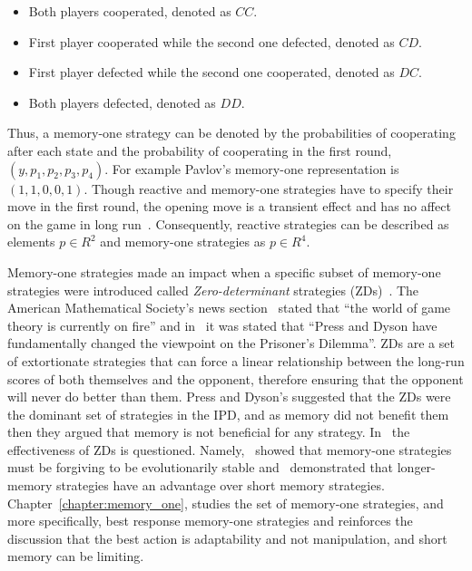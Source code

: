 \begin{itemize}
    \item Both players cooperated, denoted as \(CC\).
    \item First player cooperated while the second one defected, denoted as \(CD\).
    \item First player defected while the second one cooperated, denoted as \(DC\).
    \item Both players defected, denoted as \(DD\).
\end{itemize}

Thus, a memory-one strategy can be denoted by the probabilities of cooperating
after each state and the probability of cooperating in the first round, \((y,
p_1, p_2, p_3, p_4)\). For example Pavlov's memory-one representation is \((1,
1, 0, 0, 1)\). Though reactive and memory-one strategies have to specify their
move in the first round, the opening move is a transient effect and has no affect
on the game in long run~\cite{sigmund2010calculus}. Consequently, reactive strategies
can be described as elements \(p \in R^2\) and memory-one strategies as \(p \in R^4\).

Memory-one strategies made an impact when a specific subset of memory-one
strategies were introduced called \textit{Zero-determinant} strategies
(ZDs)~\cite{Press2012}. The American Mathematical Society's news section~\cite{Hilbe2015}
stated that ``the world of game theory is currently on fire'' and in~\cite{Stewart2012}
it was stated that
``Press and Dyson have fundamentally changed the viewpoint on the Prisoner's Dilemma''.
ZDs are a set of
extortionate strategies that can force a linear relationship between
the long-run scores of both themselves and the opponent, therefore ensuring that the
opponent will never do better than them. Press and Dyson's suggested that the ZDs
were the dominant set of strategies in the
IPD, and as memory did not benefit them then they argued that memory is not beneficial for any strategy. In~\cite{Adami2013, Knight2017,
Hilbe2013, Hilbe2013b, Hilbe2015, KnightHGC17, Knight2019, Lee2015, Stewart2012} the
effectiveness of ZDs is questioned. Namely,~\cite{Stewart2013, Stewart2016}
showed that memory-one strategies must be forgiving to be evolutionarily stable
and~\cite{Knight2017, Hilbe2017, KnightHGC17, Knight2019, Lee2015, Pan2015} demonstrated
that longer-memory strategies have an advantage over short memory
strategies. Chapter~\ref{chapter:memory_one}, studies the set of memory-one strategies,
and more specifically, best response memory-one strategies and reinforces the
discussion that the best action is adaptability and not manipulation, and short
memory can be limiting.

